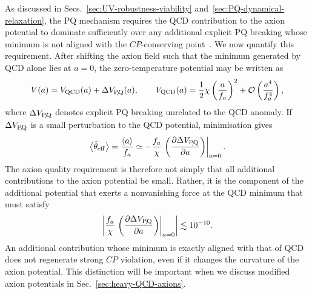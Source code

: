 \documentclass[review]{elsarticle}
\numberwithin{equation}{section}
\numberwithin{table}{section}
\numberwithin{figure}{section}
\begin{document}
As discussed in Secs.~\ref{sec:UV-robustness-viability} and~\ref{sec:PQ-dynamical-relaxation}, the PQ mechanism requires the QCD contribution to the axion potential to dominate sufficiently over any additional explicit PQ breaking whose minimum is not aligned with the $CP$-conserving point~\cite{Barr:1992qq,Holman:1992us,Kamionkowski:1992mf,DiLuzio:2020wdo}. We now quantify this requirement. After shifting the axion field such that the minimum generated by QCD alone lies at $a=0$, the zero-temperature potential may be written as
\begin{align}
    V(a)
    =
    V_{\rm QCD}(a)
    +
    \Delta V_{\slashed{\rm PQ}}(a),
    \qquad
    V_{\rm QCD}(a)
    =
    \frac{1}{2}\chi
    \left(
        \frac{a}{f_a}
    \right)^2
    +\mathcal{O}\left(\frac{a^4}{f_a^4}\right),
    \label{eq:axion-quality-general-potential}
\end{align}
where $\Delta V_{\slashed{\rm PQ}}$ denotes explicit PQ breaking unrelated to the QCD anomaly. If $\Delta V_{\slashed{\rm PQ}}$ is a small perturbation to the QCD potential, minimisation gives
\begin{align}
\left\langle\bar\theta_{\rm eff}\right\rangle
    =
    \frac{\langle a\rangle}{f_a}
    \simeq
    -\frac{f_a}{\chi}
    \left.
\left(\frac{\partial\Delta V_{\slashed{\rm PQ}}}
         {\partial a}\right)
    \right|_{a=0}.
    \label{eq:axion-quality-general-shift}
\end{align}
The axion quality requirement is therefore not simply that all additional contributions to the axion potential be small. Rather, it is the component of the additional potential that exerts a nonvanishing force at the QCD minimum that must satisfy
\begin{align}
    \left|
    \frac{f_a}{\chi}
    \left.
    \left(\frac{\partial\Delta V_{\slashed{\rm PQ}}}
         {\partial a}\right)
    \right|_{a=0}
    \right|
    \lesssim
    10^{-10}.
    \label{eq:axion-quality-general-criterion}
\end{align}
An additional contribution whose minimum is exactly aligned with that of QCD does not regenerate strong $CP$ violation, even if it changes the curvature of the axion potential. This distinction will be important when we discuss modified axion potentials in Sec.~\ref{sec:heavy-QCD-axions}.
\end{document}
